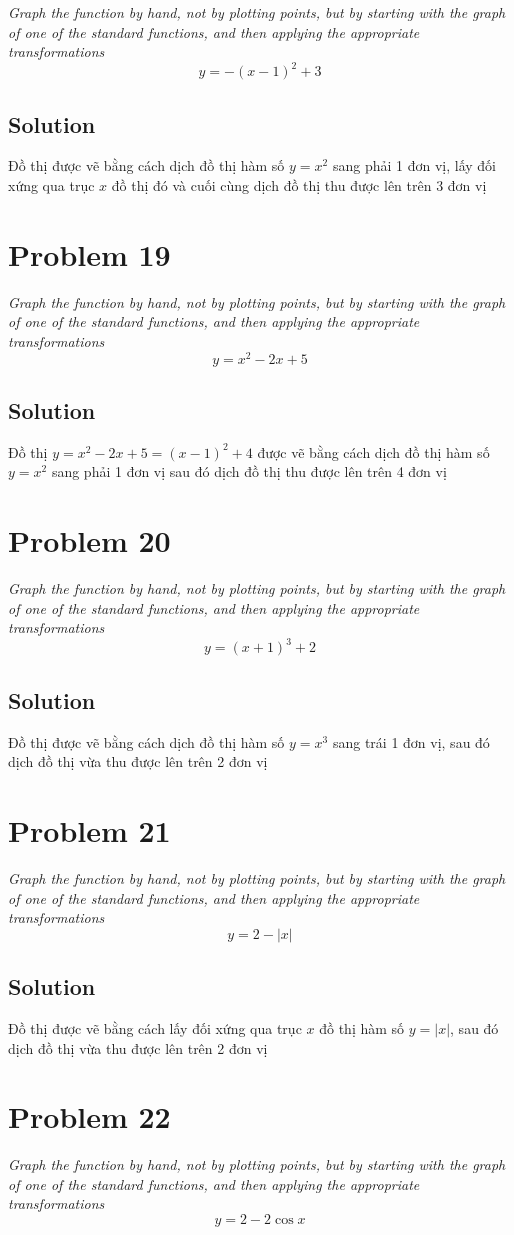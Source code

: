 \documentclass[11pt]{article}
\newcommand{\soln}{\subsection*}
\newcommand{\qn}{\textit}
\begin{document}
\qn{Graph the function by hand, not by plotting points, but by starting with the graph of one of the standard functions, and then applying the appropriate transformations $$y=-(x-1)^2+3$$}

\soln{Solution}
Đồ thị được vẽ bằng cách dịch đồ thị hàm số $y=x^2$ sang phải 1 đơn vị, lấy đối xứng qua trục $x$ đồ thị đó và cuối cùng dịch đồ thị thu được lên trên 3 đơn vị

\section*{Problem 19}

\qn{Graph the function by hand, not by plotting points, but by starting with the graph of one of the standard functions, and then applying the appropriate transformations $$y=x^2-2x+5$$}

\soln{Solution}
Đồ thị $y=x^2-2x+5=(x-1)^2+4$ được vẽ bằng cách dịch đồ thị hàm số $y=x^2$ sang phải 1 đơn vị sau đó dịch đồ thị thu được lên trên 4 đơn vị

\section*{Problem 20}

\qn{Graph the function by hand, not by plotting points, but by starting with the graph of one of the standard functions, and then applying the appropriate transformations $$y=(x+1)^3+2$$}

\soln{Solution}
Đồ thị được vẽ bằng cách dịch đồ thị hàm số $y=x^3$ sang trái 1 đơn vị, sau đó dịch đồ thị vừa thu được lên trên 2 đơn vị


\section*{Problem 21}

\qn{Graph the function by hand, not by plotting points, but by starting with the graph of one of the standard functions, and then applying the appropriate transformations $$y=2-|x|$$}

\soln{Solution}
Đồ thị được vẽ bằng cách lấy đối xứng qua trục $x$ đồ thị hàm số $y=|x|$, sau đó dịch đồ thị vừa thu được lên trên 2 đơn vị

\section*{Problem 22}

\qn{Graph the function by hand, not by plotting points, but by starting with the graph of one of the standard functions, and then applying the appropriate transformations $$y=2-2\cos{x}$$}
\end{document}
